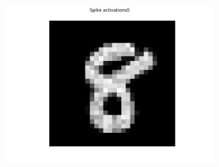 \begin{figure}
\begin{subfigure}[t]{.24\textwidth}
  		\label{fig:sub2}
	\end{subfigure}
	\begin{subfigure}[t]{.24\textwidth}
  		\centering
  		\includegraphics[width=.9\linewidth]{imgs/convert/cuba00000.png}
  		\label{fig:sub2}
	\end{subfigure}
	

\end{figure}
